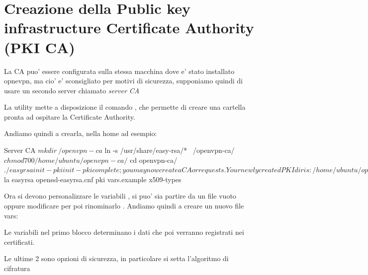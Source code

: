 \section{Creazione della Public key infrastructure Certificate Authority (PKI CA)}
\label{sec:pki_ca}


La CA puo' essere configurata sulla stessa macchina dove e' stato installato opnevpn, ma cio' e' sconsigliato per motivi di sicurezza, supponiamo quindi di usare un secondo server chiamato \textit{server CA}

La utility  mette a disposizione il comando , che permette di creare una cartella pronta ad ospitare la Certificate Authority.

Andiamo quindi a crearla, nella home ad esempio:

\begin{bashcode}{Server CA}{}
$ mkdir ~/openvpn-ca
$ ln -s /usr/share/easy-rsa/* ~/openvpn-ca/
$ chmod 700 /home/ubuntu/openvpn-ca/
$ cd openvpn-ca/
$ ./easyrsa init-pki

init-pki complete; you may now create a CA or requests.
Your newly created PKI dir is: /home/ubuntu/openvpn-ca/pki

$ la
easyrsa  openssl-easyrsa.cnf  pki  vars.example  x509-types
\end{bashcode}

Ora si devono personalizzare le variabili , si puo' sia partire da un file vuoto oppure modificare  per poi rinominarlo .
Andiamo quindi a creare un nuovo file vars:


Le variabili nel primo blocco determinano i dati che poi verranno registrati nei certificati.

Le ultime 2 sono opzioni di sicurezza, in particolare si setta l'algoritmo di cifratura %

